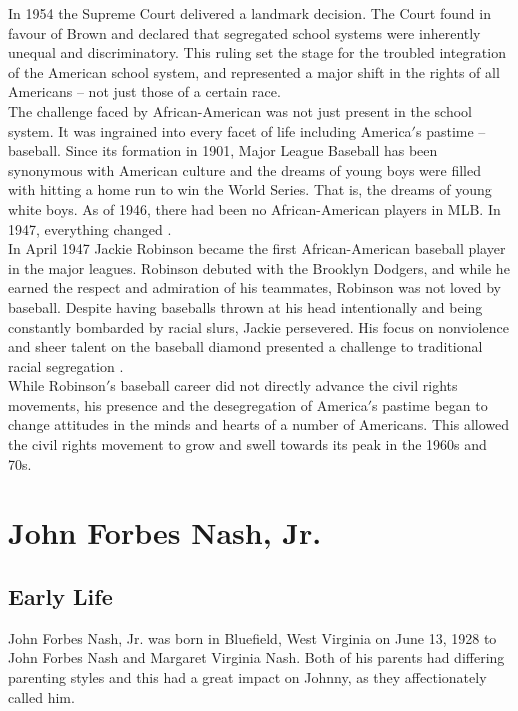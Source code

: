 \documentclass[12pt]{article}
\begin{document}
In 1954 the Supreme Court delivered a landmark decision. The Court found in favour of Brown and declared that segregated school systems were inherently unequal and discriminatory. This ruling set the stage for the troubled integration of the American school system, and represented a major shift in the rights of all Americans – not just those of a certain race.\\

The challenge faced by African-American was not just present in the school system. It was ingrained into every facet of life including America$'$s pastime – baseball. Since its formation in 1901, Major League Baseball has been synonymous with American culture and the dreams of young boys were filled with hitting a home run to win the World Series. That is, the dreams of young white boys. As of 1946, there had been no African-American players in MLB. In 1947, everything changed \cite{22}.\\

In April 1947 Jackie Robinson became the first African-American baseball player in the major leagues. Robinson debuted with the Brooklyn Dodgers, and while he earned the respect and admiration of his teammates, Robinson was not loved by baseball. Despite having baseballs thrown at his head intentionally and being constantly bombarded by racial slurs, Jackie persevered. His focus on nonviolence and sheer talent on the baseball diamond presented a challenge to traditional racial segregation \cite{23}.\\

While Robinson$'$s baseball career did not directly advance the civil rights movements, his presence and the desegregation of America$'$s pastime began to change attitudes in the minds and hearts of a number of Americans. This allowed the civil rights movement to grow and swell towards its peak in the 1960s and 70s. 

\section{John Forbes Nash, Jr. \cite{24}}

\subsection{Early Life}
John Forbes Nash, Jr. was born in Bluefield, West Virginia on June 13, 1928 to John Forbes Nash and Margaret Virginia Nash. Both of his parents had differing parenting styles and this had a great impact on Johnny, as they affectionately called him.\\
\end{document}
